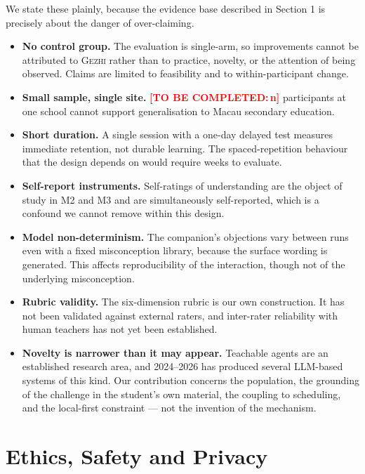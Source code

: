 \documentclass[11pt,a4paper]{article}
\newcommand{\fillin}[1]{\textcolor{red}{\textbf{[TO BE COMPLETED:\,#1]}}}
\newcommand{\gezhi}{\textsc{Gezhi}}
\begin{document}
We state these plainly, because the evidence base described in Section 1 is precisely about
the danger of over-claiming.

\begin{itemize}
  \item \textbf{No control group.} The evaluation is single-arm, so improvements cannot be
  attributed to \gezhi{} rather than to practice, novelty, or the attention of being
  observed. Claims are limited to feasibility and to within-participant change.
  \item \textbf{Small sample, single site.} \fillin{n} participants at one school cannot
  support generalisation to Macau secondary education.
  \item \textbf{Short duration.} A single session with a one-day delayed test measures
  immediate retention, not durable learning. The spaced-repetition behaviour that the design
  depends on would require weeks to evaluate.
  \item \textbf{Self-report instruments.} Self-ratings of understanding are the object of
  study in M2 and M3 and are simultaneously self-reported, which is a confound we cannot
  remove within this design.
  \item \textbf{Model non-determinism.} The companion's objections vary between runs even
  with a fixed misconception library, because the surface wording is generated. This affects
  reproducibility of the interaction, though not of the underlying misconception.
  \item \textbf{Rubric validity.} The six-dimension rubric is our own construction. It has
  not been validated against external raters, and inter-rater reliability with human teachers
  has not yet been established.
  \item \textbf{Novelty is narrower than it may appear.} Teachable agents are an established
  research area, and 2024--2026 has produced several LLM-based systems of this kind. Our
  contribution concerns the population, the grounding of the challenge in the student's own
  material, the coupling to scheduling, and the local-first constraint --- not the invention
  of the mechanism.
\end{itemize}

\section{Ethics, Safety and Privacy}
\end{document}
